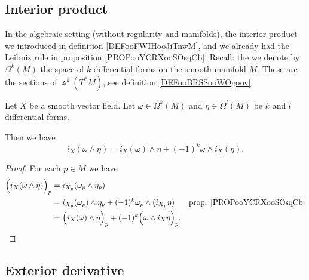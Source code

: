 \subsection{Interior product}

In the algebraic setting (without regularity and manifolds), the interior product we introduced in definition \ref{DEFooFWIHooJiTnwM}, and we already had the Leibniz rule in proposition \ref{PROPooYCRXooSOsqCb}. Recall: the we denote by \( \Omega^k(M)\) the space of \( k\)-differential forms on the smooth manifold \( M\). These are the sections of \( \Wedge^k(T^*M)\), see definition \ref{DEFooBRSSooWOgoov}.

\begin{proposition}		\label{PROPooIQIUooTDNJdB}
	Let \( X\) be a smooth vector field. Let \( \omega\in \Omega^k(M)\) and \( \eta\in \Omega^l(M)\) be \( k\) and \( l\) differential forms.

	Then we have
	\begin{equation}
		i_X(\omega\wedge \eta)=i_X(\omega)\wedge \eta+(-1)^k\omega\wedge i_X(\eta).
	\end{equation}
\end{proposition}

\begin{proof}
	For each \( p\in M\) we have
	\begin{subequations}
		\begin{align}
			\Big( i_X(\omega\wedge \eta) \Big)_p & = i_{X_p}(\omega_p\wedge \eta_p)                                                                                         \\
			                                     & = i_{X_p}(\omega_p)\wedge\eta_p+(-1)^k\omega_p\wedge(i_{X_p}\eta)                & \text{prop. \ref{PROPooYCRXooSOsqCb}} \\
			                                     & = \Big( i_X(\omega)\wedge \eta \Big)_p+(-1)^k\Big( \omega\wedge i_X\eta \Big)_p.
		\end{align}
	\end{subequations}
\end{proof}


\subsection{Exterior derivative}

